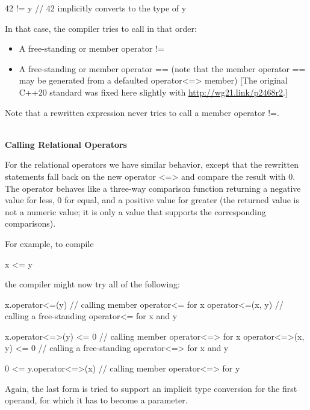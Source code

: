 \begin{cpp}
42 != y // 42 implicitly converts to the type of y
\end{cpp}

In that case, the compiler tries to call in that order:

\begin{itemize}
\item
A free-standing or member operator !=

\item
A free-standing or member operator == (note that the member operator == may be generated from a defaulted operator<=> member) [The original C++20 standard was fixed here slightly with \url{http://wg21.link/p2468r2}.]
\end{itemize}

Note that a rewritten expression never tries to call a member operator !=.

\noindent
\hspace*{\fill} \\ %
\textbf{Calling Relational Operators}

For the relational operators we have similar behavior, except that the rewritten statements fall back on the new operator <=> and compare the result with 0. The operator behaves like a three-way comparison function returning a negative value for less, 0 for equal, and a positive value for greater (the returned value is not a numeric value; it is only a value that supports the corresponding comparisons).

For example, to compile

\begin{cpp}
x <= y
\end{cpp}

the compiler might now try all of the following:

\begin{cpp}
x.operator<=(y) // calling member operator<= for x
operator<=(x, y) // calling a free-standing operator<= for x and y

x.operator<=>(y) <= 0 // calling member operator<=> for x
operator<=>(x, y) <= 0 // calling a free-standing operator<=> for x and y

0 <= y.operator<=>(x) // calling member operator<=> for y
\end{cpp}

Again, the last form is tried to support an implicit type conversion for the first operand, for which it has to become a parameter.






